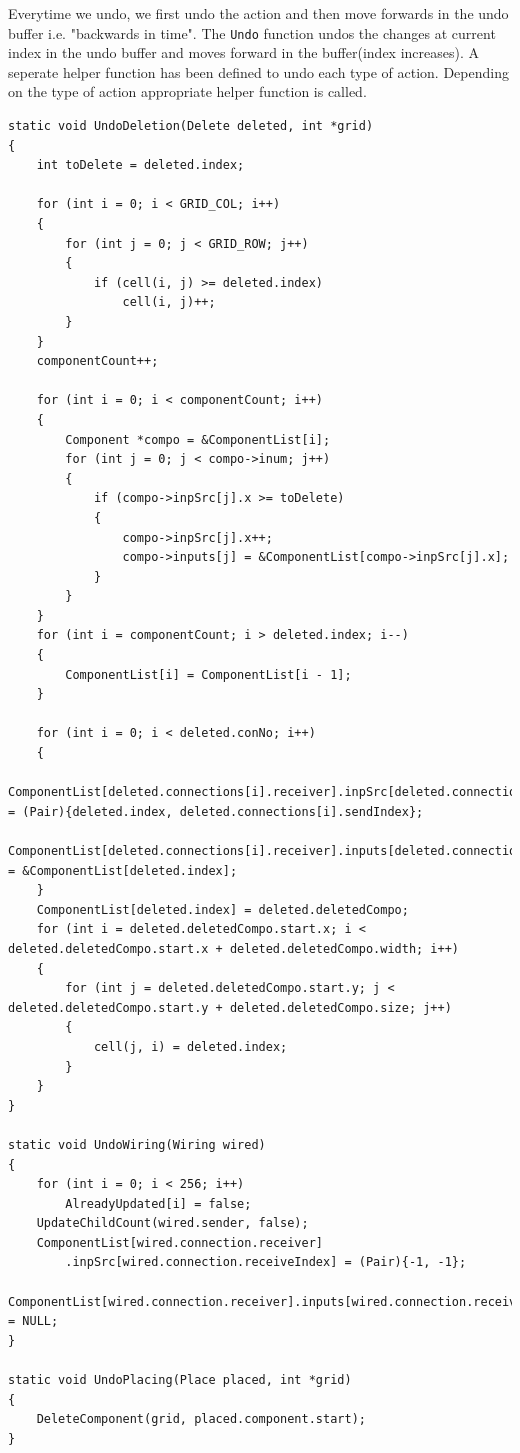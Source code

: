 \documentclass[report]{subfiles}
\begin{document}
Everytime we undo, we first undo the action and then move forwards in the undo buffer i.e. "backwards in time". The \texttt{Undo} function undos the changes at current index in the undo buffer and moves forward in the buffer(index increases). A seperate helper function has been defined to undo each type of action.
Depending on the type of action appropriate helper function is called.
\begin{lstlisting}
static void UndoDeletion(Delete deleted, int *grid)
{
    int toDelete = deleted.index;

    for (int i = 0; i < GRID_COL; i++)
    {
        for (int j = 0; j < GRID_ROW; j++)
        {
            if (cell(i, j) >= deleted.index)
                cell(i, j)++;
        }
    }
    componentCount++;

    for (int i = 0; i < componentCount; i++)
    {
        Component *compo = &ComponentList[i];
        for (int j = 0; j < compo->inum; j++)
        {
            if (compo->inpSrc[j].x >= toDelete)
            {
                compo->inpSrc[j].x++;
                compo->inputs[j] = &ComponentList[compo->inpSrc[j].x];
            }
        }
    }
    for (int i = componentCount; i > deleted.index; i--)
    {
        ComponentList[i] = ComponentList[i - 1];
    }

    for (int i = 0; i < deleted.conNo; i++)
    {
        ComponentList[deleted.connections[i].receiver].inpSrc[deleted.connections[i].receiveIndex] = (Pair){deleted.index, deleted.connections[i].sendIndex};
        ComponentList[deleted.connections[i].receiver].inputs[deleted.connections[i].receiveIndex] = &ComponentList[deleted.index];
    }
    ComponentList[deleted.index] = deleted.deletedCompo;
    for (int i = deleted.deletedCompo.start.x; i < deleted.deletedCompo.start.x + deleted.deletedCompo.width; i++)
    {
        for (int j = deleted.deletedCompo.start.y; j < deleted.deletedCompo.start.y + deleted.deletedCompo.size; j++)
        {
            cell(j, i) = deleted.index;
        }
    }
}

static void UndoWiring(Wiring wired)
{
    for (int i = 0; i < 256; i++)
        AlreadyUpdated[i] = false;
    UpdateChildCount(wired.sender, false);
    ComponentList[wired.connection.receiver]
        .inpSrc[wired.connection.receiveIndex] = (Pair){-1, -1};
    ComponentList[wired.connection.receiver].inputs[wired.connection.receiveIndex] = NULL;
}

static void UndoPlacing(Place placed, int *grid)
{
    DeleteComponent(grid, placed.component.start);
}


\end{lstlisting}
\end{document}

